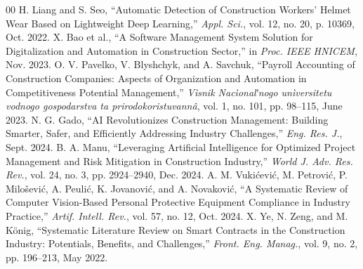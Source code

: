 \documentclass[conference]{IEEEtran}
\begin{document}
\begin{thebibliography}{00}
 H. Liang and S. Seo, ``Automatic Detection of Construction Workers' Helmet Wear Based on Lightweight Deep Learning,'' \textit{Appl. Sci.}, vol. 12, no. 20, p. 10369, Oct. 2022.
 X. Bao et al., ``A Software Management System Solution for Digitalization and Automation in Construction Sector,'' in \textit{Proc. IEEE HNICEM}, Nov. 2023.
 O. V. Pavelko, V. Blyshchyk, and A. Savchuk, ``Payroll Accounting of Construction Companies: Aspects of Organization and Automation in Competitiveness Potential Management,'' \textit{Vìsnik Nacìonalʹnogo unìversitetu vodnogo gospodarstva ta prirodokoristuvannâ}, vol. 1, no. 101, pp. 98--115, June 2023.
 N. G. Gado, ``AI Revolutionizes Construction Management: Building Smarter, Safer, and Efficiently Addressing Industry Challenges,'' \textit{Eng. Res. J.}, Sept. 2024.
 B. A. Manu, ``Leveraging Artificial Intelligence for Optimized Project Management and Risk Mitigation in Construction Industry,'' \textit{World J. Adv. Res. Rev.}, vol. 24, no. 3, pp. 2924--2940, Dec. 2024.
 A. M. Vukićević, M. Petrović, P. Milošević, A. Peulić, K. Jovanović, and A. Novaković, ``A Systematic Review of Computer Vision-Based Personal Protective Equipment Compliance in Industry Practice,'' \textit{Artif. Intell. Rev.}, vol. 57, no. 12, Oct. 2024.
 X. Ye, N. Zeng, and M. König, ``Systematic Literature Review on Smart Contracts in the Construction Industry: Potentials, Benefits, and Challenges,'' \textit{Front. Eng. Manag.}, vol. 9, no. 2, pp. 196--213, May 2022.
\end{thebibliography}
\end{document}
